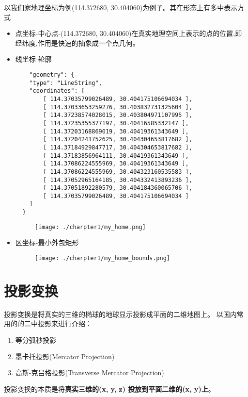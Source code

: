 \begin{note}
	以我们家地理坐标为例(114.372680, 30.404060)为例子。其在形态上有多中表示方式
	\begin{itemize}
		\item 点坐标-中心点-(114.372680, 30.404060)在真实地理空间上表示的点的位置,即经纬度,作用是快速的抽象成一个点几何。
		\item 线坐标-轮廓
		      \begin{lstlisting}
    "geometry": {
    "type": "LineString",
    "coordinates": [
        [ 114.37035799026489, 30.404175106694034 ],
        [ 114.37033653259276, 30.403832731325604 ],
        [ 114.37238574028015, 30.403804971107995 ],
        [ 114.37235355377197, 30.40416585332147 ],
        [ 114.37203168869019, 30.40419361343649 ],
        [ 114.37204241752625, 30.404304653817682 ],
        [ 114.37184929847717, 30.404304653817682 ],
        [ 114.37183856964111, 30.40419361343649 ],
        [ 114.37086224555969, 30.40419361343649 ],
        [ 114.37086224555969, 30.404323160535583 ],
        [ 114.37052965164185, 30.404332413893236 ],
        [ 114.37051892280579, 30.404184360065706 ],
        [ 114.37035799026489, 30.404175106694034 ]
    ]
  }
  \end{lstlisting}
		      \begin{figure}[!htb]
			      \centering
			      \texttt{[image: ./charpter1/my\_home.png]}
		      \end{figure}
		\item 区坐标-最小外包矩形
		      \begin{figure}[!htb]
			      \centering
			      \texttt{[image: ./charpter1/my\_home\_bounds.png]}
		      \end{figure}
	\end{itemize}
\end{note}



\section{投影变换}
投影变换是将真实的三维的椭球的地球显示投影成平面的二维地图上。
以国内常用的的二中投影来进行介绍：
\begin{enumerate}
	\item 等分弧秒投影
	\item 墨卡托投影(Mercator Projection)
	\item 高斯-克吕格投影(Transverse Mercator Projection)
\end{enumerate}
投影变换的本质是将\textbf{真实三维的(x, y, z) 投放到平面二维的(x, y)上}。

